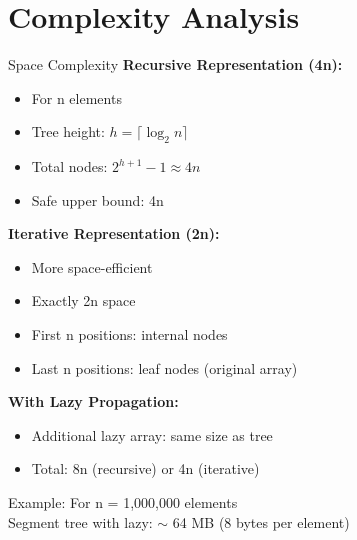 \documentclass[aspectratio=169]{beamer}
\begin{document}
\section{Complexity Analysis}

\begin{frame}{Space Complexity}
  \textbf{Recursive Representation (4n):}
  \begin{itemize}
    \item For n elements
    \item Tree height: $h = \lceil \log_2 n \rceil$
    \item Total nodes: $2^{h+1} - 1 \approx 4n$
    \item Safe upper bound: 4n
  \end{itemize}

  \vspace{0.5cm}
  \textbf{Iterative Representation (2n):}
  \begin{itemize}
    \item More space-efficient
    \item Exactly 2n space
    \item First n positions: internal nodes
    \item Last n positions: leaf nodes (original array)
  \end{itemize}

  \vspace{0.5cm}
  \textbf{With Lazy Propagation:}
  \begin{itemize}
    \item Additional lazy array: same size as tree
    \item Total: 8n (recursive) or 4n (iterative)
  \end{itemize}

  \vspace{0.3cm}
  Example: For n = 1,000,000 elements\\
  Segment tree with lazy: $\sim$ 64 MB (8 bytes per element)
\end{frame}
\end{document}
